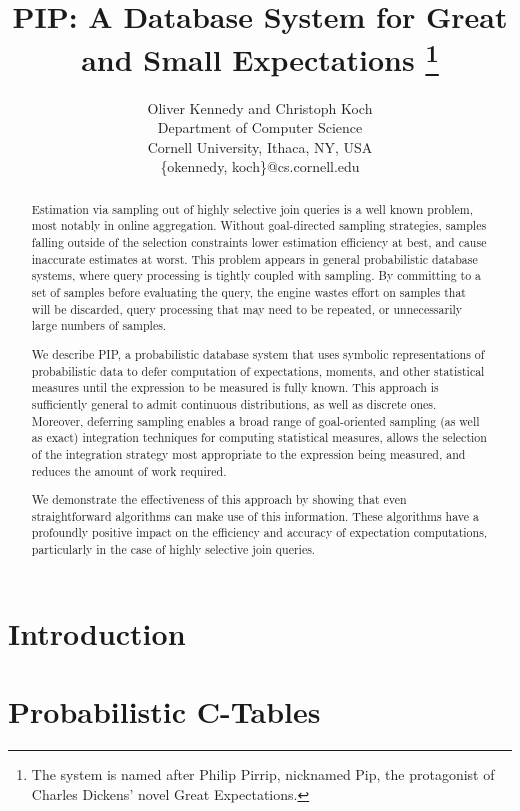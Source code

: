 \documentclass{vldb}
\title{PIP: A Database System for Great and Small Expectations%
\thanks{The
system is named after Philip Pirrip, nicknamed Pip, the protagonist of
Charles Dickens' novel Great Expectations.}}
\author{Oliver Kennedy and Christoph Koch\\
Department of Computer Science \\
Cornell University, Ithaca, NY, USA \\
\{okennedy, koch\}@cs.cornell.edu}
\date{}
\begin{document}


\maketitle



\begin{abstract}
Estimation via sampling out of highly selective join queries is a well known problem, most notably in online aggregation.  Without goal-directed sampling strategies, samples falling outside of the selection constraints lower estimation efficiency at best, and cause inaccurate estimates at worst.  This problem appears in general probabilistic database systems, where query processing is tightly coupled with sampling.  By committing to a set of samples before evaluating the query, the engine wastes effort on samples that will be discarded, query processing that may need to be repeated, or unnecessarily large numbers of samples.  

We describe PIP, a probabilistic database system that uses symbolic representations of probabilistic data to defer computation of expectations, moments, and other statistical measures until the expression to be measured is fully known.  This approach is sufficiently general to admit continuous distributions, as well as discrete ones.  Moreover, deferring sampling enables a broad range of goal-oriented sampling (as well as exact) integration techniques for computing statistical measures, allows the selection of the integration strategy most appropriate to the expression being measured, and reduces the amount of work required.  

We demonstrate the effectiveness of this approach by showing that even straightforward algorithms can make use of this information.  These algorithms have a profoundly positive impact on the efficiency and accuracy of expectation computations, particularly in the case of highly selective join queries.
\end{abstract}



\section{Introduction}
\label{sec:introduction}


\section{Probabilistic C-Tables}
\label{sec:background}

\end{document}
